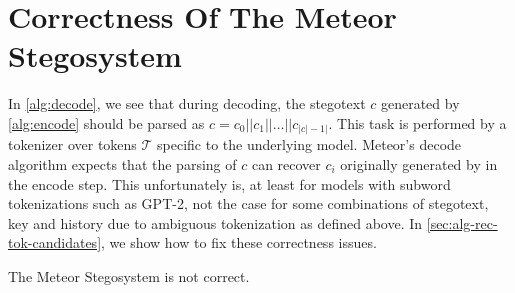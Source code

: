 
\section{Correctness Of The Meteor Stegosystem}

In \autoref{alg:decode}, we see that during decoding, the stegotext $c$ generated by \autoref{alg:encode} should be parsed as $c = c_0 ||c_1 || \dots || c_{|c|-1|}$.
This task is performed by a tokenizer over tokens $\mathcal{T}$ specific to the underlying model.
Meteor's decode algorithm expects that the parsing of $c$ can recover $c_i$ originally generated by in the encode step.
This unfortunately is, at least for models with subword tokenizations such as GPT-2, not the case for some combinations of stegotext, key and history due to ambiguous tokenization as defined above.
In \autoref{sec:alg-rec-tok-candidates}, we show how to fix these correctness issues.

\begin{theorem}
The Meteor Stegosystem is not correct.
\end{theorem}

